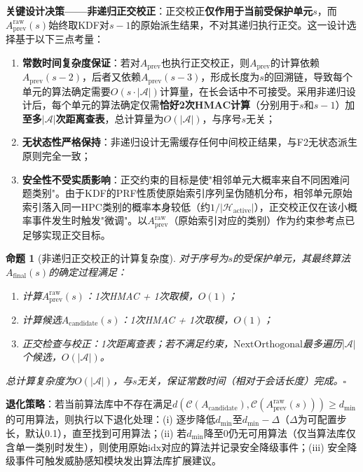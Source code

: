 ﻿\documentclass[12pt,a4paper]{article}
\newtheorem{proposition}{命题}
\begin{document}
\textbf{关键设计决策——非递归正交校正}：正交校正\textbf{仅作用于当前受保护单元$s$}，而$A_{\text{prev}}^{\text{raw}}(s)$始终取KDF对$s-1$的原始派生结果，不对其递归执行正交。这一设计选择基于以下三点考量：

\begin{enumerate}[label=(\roman*)]
    \item \textbf{常数时间复杂度保证}：若对$A_{\text{prev}}$也执行正交校正，则$A_{\text{prev}}$的计算依赖$A_{\text{prev}}(s-2)$，后者又依赖$A_{\text{prev}}(s-3)$，形成长度为$s$的回溯链，导致每个单元的算法确定需要$O(s \cdot |\mathcal{A}|)$计算量，在长会话中不可接受。采用非递归设计后，每个单元的算法确定仅需\textbf{恰好2次HMAC计算}（分别用于$s$和$s-1$）加\textbf{至多$|\mathcal{A}|$次距离查表}，总计算量为$O(|\mathcal{A}|)$，与序号$s$无关；
    \item \textbf{无状态性严格保持}：非递归设计无需缓存任何中间校正结果，与F2无状态派生原则完全一致；
    \item \textbf{安全性不受实质影响}：正交约束的目标是使"相邻单元大概率来自不同困难问题类别"。由于KDF的PRF性质使原始索引序列呈伪随机分布，相邻单元原始索引落入同一HPC类别的概率本身较低（约$1/|\mathcal{H}_{\text{active}}|$），正交校正仅在该小概率事件发生时触发"微调"。以$A_{\text{prev}}^{\text{raw}}$（原始索引对应的类别）作为约束参考点已足够实现正交目标。
\end{enumerate}

\begin{proposition}[非递归正交校正的计算复杂度]
对于序号为$s$的受保护单元，其最终算法$A_{\text{final}}(s)$的确定过程满足：
\begin{enumerate}[label=(\alph*)]
    \item 计算$A_{\text{prev}}^{\text{raw}}(s)$：1次HMAC + 1次取模，$O(1)$；
    \item 计算候选$A_{\text{candidate}}(s)$：1次HMAC + 1次取模，$O(1)$；
    \item 正交检查与校正：1次距离查表；若不满足约束，$\mathrm{NextOrthogonal}$最多遍历$|\mathcal{A}|$个候选，$O(|\mathcal{A}|)$。
\end{enumerate}
总计算复杂度为$O(|\mathcal{A}|)$，与$s$无关，保证常数时间（相对于会话长度）完成。$\square$
\end{proposition}

\textbf{退化策略}：若当前算法库中不存在满足$d(\mathcal{C}(A_{\text{candidate}}), \mathcal{C}(A_{\text{prev}}^{\text{raw}}(s))) \geq d_{\min}$的可用算法，则执行以下退化处理：(i) 逐步降低$d_{\min}$至$d_{\min} - \Delta$（$\Delta$为可配置步长，默认0.1），直至找到可用算法；(ii) 若$d_{\min}$降至0仍无可用算法（仅当算法库仅含单一类别时发生），则使用原始$\text{idx}$对应的算法并记录安全降级事件；(iii) 安全降级事件可触发威胁感知模块发出算法库扩展建议。
\end{document}
